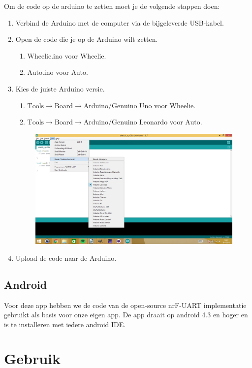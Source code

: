 \documentclass[12pt,a4paper]{article}
\begin{document}
\newpage
Om de code op de arduino te zetten moet je de volgende stappen doen:
\begin{enumerate}
	\item Verbind de Arduino met de computer via de bijgeleverde USB-kabel.
	\item Open de code die je op de Arduino wilt zetten.
		\begin{enumerate}
			\item Wheelie.ino voor Wheelie.
			\item Auto.ino voor Auto.
		\end{enumerate}
	\item Kies de juiste Arduino versie.  
	\begin{enumerate}
		\item $ \text{Tools} \rightarrow \text{Board} \rightarrow \text{Arduino/Genuino Uno} $ voor Wheelie.
		\item $ \text{Tools} \rightarrow \text{Board} \rightarrow \text{Arduino/Genuino Leonardo} $ voor Auto.
	\end{enumerate}	
	\begin{figure}[h]
		\centering
		\includegraphics[width=0.7\linewidth]{board_selecteren}
		\label{fig:board_selecteren}
	\end{figure}
	\item Upload de code naar de Arduino.		
\end{enumerate}

\subsection{Android}
Voor deze app hebben we de code van de open-source nrF-UART implementatie \cite{nrf_ua} gebruikt als basis voor onze eigen app. 
De app draait op android 4.3 en hoger en is te installeren met iedere android IDE. 

\section{Gebruik}
\end{document}
